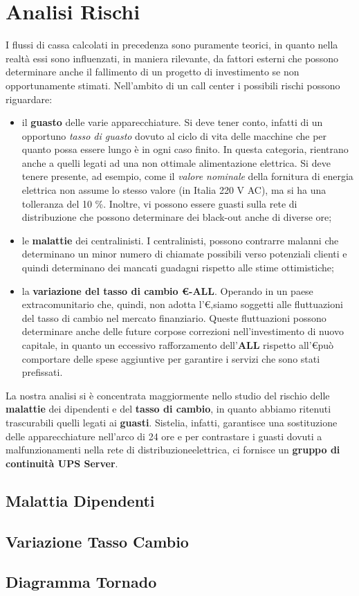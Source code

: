 \chapter[Analisi Rischi]{Analisi Rischi}
I flussi di cassa calcolati in precedenza sono puramente teorici, in quanto nella realtà essi sono influenzati, in maniera rilevante, da fattori esterni che possono determinare anche il fallimento di un progetto di investimento se non opportunamente stimati.
Nell'ambito di un call center i possibili rischi possono riguardare:
\begin{itemize}
\item il \textbf{guasto} delle varie apparecchiature. Si deve tener conto, infatti di un opportuno \textit{tasso di guasto} dovuto al ciclo di vita delle macchine che per quanto possa essere lungo è in ogni caso finito. In questa categoria, rientrano anche a quelli legati ad una non ottimale alimentazione elettrica. Si deve tenere presente, ad esempio, come il \textit{valore nominale} della fornitura di energia elettrica non assume lo stesso valore (in Italia 220 V AC), ma si ha una tolleranza del 10 \%. Inoltre, vi possono essere guasti sulla rete di distribuzione che possono determinare dei black-out anche di diverse ore;
\item le \textbf{malattie} dei centralinisti. I centralinisti, possono contrarre malanni che determinano un minor numero di chiamate possibili verso potenziali clienti e quindi determinano dei mancati guadagni rispetto alle stime ottimistiche;
\item la \textbf{variazione del tasso di cambio \euro -ALL}. Operando in un paese extracomunitario che, quindi, non adotta l'\euro ,siamo soggetti alle fluttuazioni del tasso di cambio nel mercato finanziario. Queste fluttuazioni possono determinare anche delle future corpose correzioni nell'investimento di nuovo capitale, in quanto un eccessivo rafforzamento dell'\textbf{ALL} rispetto all'\euro può comportare delle spese aggiuntive per garantire i servizi che sono stati prefissati.  
\end{itemize} 
La nostra analisi si è concentrata maggiormente nello studio del rischio delle \textbf{malattie} dei dipendenti e del \textbf{tasso di cambio}, in quanto abbiamo ritenuti trascurabili quelli legati ai \textbf{guasti}. Sistelia, infatti, garantisce una sostituzione delle apparecchiature nell'arco di 24 ore e per contrastare i guasti dovuti a malfunzionamenti nella rete di distribuzioneelettrica, ci fornisce un \textbf{gruppo di continuità \ac{UPS} Server}.

\section[Malattia Dipendenti]{Malattia Dipendenti}
	

\section[Variazione Tasso Cambio]{Variazione Tasso Cambio}
	
	
\section[Diagramma Tornado]{Diagramma Tornado}	
	